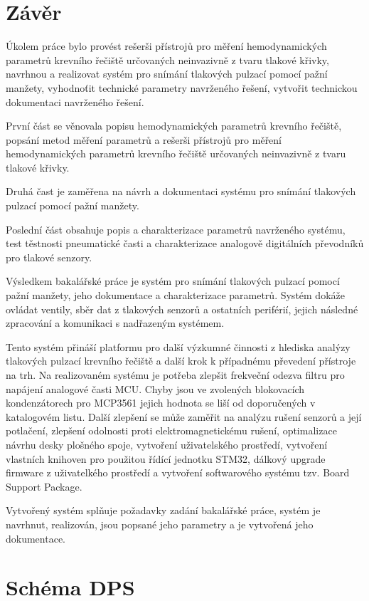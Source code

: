 \documentclass{ctuthesis}
\begin{document}
\chapter{Závěr}
Úkolem práce bylo provést rešerši přístrojů pro měření hemodynamických parametrů krevního řečiště určovaných neinvazivně z tvaru
tlakové křivky, navrhnou a realizovat systém pro snímání tlakových pulzací pomocí pažní manžety, vyhodnoťit technické parametry navrženého řešení, vytvořit technickou dokumentaci navrženého řešení.
\par
První část se věnovala popisu hemodynamických parametrů krevního řečiště, popsání metod měření parametrů a rešerši přístrojů pro měření hemodynamických parametrů krevního řečiště určovaných neinvazivně z tvaru
tlakové křivky.
\par
Druhá čast je zaměřena na návrh a dokumentaci systému pro snímání tlakových pulzací pomocí pažní manžety.
\par
Poslední část obsahuje popis a charakterizace parametrů navrženého systému, test těstnosti pneumatické časti a charakterizace analogově digitálních převodníků pro tlakové senzory.
\par
Výsledkem bakalářské práce je systém pro snímání tlakových pulzací pomocí pažní manžety, jeho dokumentace a charakterizace parametrů. Systém dokáže ovládat ventily, sběr dat z tlakových senzorů a ostatních periférií, jejich následné zpracování a komunikaci s nadřazeným systémem.
\par
Tento systém přináší platformu pro další výzkumné činnosti z hlediska analýzy tlakových pulzací krevního řečiště a další krok k případnému převedení přístroje na trh. Na realizovaném systému je potřeba zlepšit frekveční odezva filtru pro napájení analogové časti MCU. Chyby jsou ve zvolených blokovacích kondenzátorech
pro MCP3561 jejich hodnota se liší od doporučených v katalogovém listu. Další zlepšení se může zaměřit na analýzu rušení senzorů a její potlačení, zlepšení odolnosti proti elektromagnetickému rušení, optimalizace návrhu desky plošného spoje, vytvoření uživatelského prostředí, vytvoření vlastních knihoven pro použitou
řídící jednotku STM32, dálkový upgrade firmware z uživatelkého prostředí a vytvoření softwarového systému tzv. Board Support Package.
\par
Vytvořený systém splňuje požadavky zadání bakalářské práce, systém je navrhnut, realizován, jsou popsané jeho parametry a je vytvořená jeho dokumentace.


\appendix

\printindex


\nocite{*}


\chapter{Schéma DPS}









\end{document}
